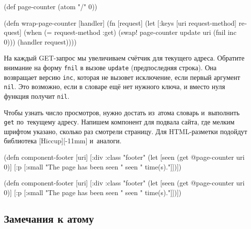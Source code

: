\else

\begin{english}
  \begin{clojure}
(def page-counter
  (atom {"/" 0}))

(defn wrap-page-counter
  [handler]
  (fn [request]
    (let [{:keys [uri request-method]} request]
      (when (= request-method :get)
        (swap! page-counter update uri (fnil inc 0)))
      (handler request))))
  \end{clojure}
\end{english}

\fi


На каждый GET-запрос мы увеличиваем счётчик для текущего адреса. Обратите
внимание на форму \verb|fnil| в вызове \verb|update| (предпоследняя строка). Она
возвращает версию \verb|inc|, которая не вызовет исключение, если первый
аргумент \verb|nil|. Это возможно, если в словаре ещё нет нужного ключа, и
вместо нуля функция получит \verb|nil|.


Чтобы узнать число просмотров, нужно достать из~атома словарь и~выполнить
\verb|get| по~текущему адресу. Напишем компонент для подвала сайта, где мелким
шрифтом указано, сколько раз смотрели страницу. Для HTML-разметки подойдут
библиотека [Hiccup][-11mm]
и~аналоги.

\ifnarrow

\begin{english}
  \begin{clojure}
(defn component-footer [uri]
  [:div {:class "footer"}
   (let [seen (get @page-counter uri 0)]
     [:p [:small
          "The page has been seen " seen
          " time(s)."]])])
  \end{clojure}
\end{english}

\else

\begin{english}
  \begin{clojure}
(defn component-footer [uri]
  [:div {:class "footer"}
   (let [seen (get @page-counter uri 0)]
     [:p [:small "The page has been seen "
                 seen
                 " time(s)."]])])
  \end{clojure}
\end{english}

\fi

\subsection{Замечания к атому}


